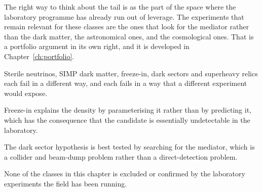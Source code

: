 The right way to think about the tail is as the part of the space where the
laboratory programme has already run out of leverage. The experiments that
remain relevant for these classes are the ones that look for the mediator
rather than the dark matter, the astronomical ones, and the cosmological
ones. That is a portfolio argument in its own right, and it is developed in
Chapter~\ref{ch:portfolio}.

\begin{keytakeaways}
\item Sterile neutrinos, SIMP dark matter, freeze-in, dark sectors and
superheavy relics each fail in a different way, and each fails in a way
that a different experiment would expose.
\item Freeze-in explains the density by parameterising it rather than by
predicting it, which has the consequence that the candidate is essentially
undetectable in the laboratory.
\item The dark sector hypothesis is best tested by searching for the
mediator, which is a collider and beam-dump problem rather than a
direct-detection problem.
\item None of the classes in this chapter is excluded or confirmed by the
laboratory experiments the field has been running.
\end{keytakeaways}
